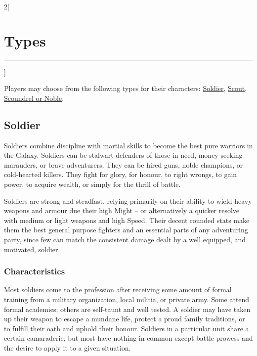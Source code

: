 \documentclass[a4paper,10pt,final]{book}
\newcommand{\HRule}{\rule{\linewidth}{0.5mm}} %
\newcommand{\newSection}[1]{\section*{#1} \addcontentsline{toc}{section}{#1} \label{sec:#1} \HRule}
\newenvironment{docsection}[1]
{
  \begin{multicols*}{2}[\newSection{#1}]
}
{
  \end{multicols*}
  \newpage
}
\begin{document}
\begin{docsection}{Types}

Players may choose from the following types for their characters: \hyperlink{sub:soldier}{Soldier}, \hyperlink{sub:scout}{Scout}, \hyperlink{sub:scoundrel_noble}{Scoundrel or Noble}.

\subsection*{Soldier} %
\label{sub:soldier}

Soldiers combine discipline with martial skills to become the best pure warriors in the Galaxy. Soldiers can be stalwart defenders of those in need, money-seeking marauders, or brave adventurers. They can be hired guns, noble champions, or cold-hearted killers. They fight for glory, for honour, to right wrongs, to gain power, to acquire wealth,  or simply for the thrill of battle. \par

Soldiers are strong and steadfast, relying primarily on their ability to wield heavy weapons and armour due their high Might -- or alternatively a quicker resolve with medium or light weapons and high Speed. Their decent rounded stats make them the best general purpose fighters and an essential parts of any adventuring party, since few can match the consistent damage dealt by a well equipped, and motivated, soldier. 

\subsubsection*{Characteristics}
\label{subsub:soldierCharacteristics}
Most soldiers come to the profession after receiving some amount of formal training from a military organization, local militia, or private army. Some attend formal academies; others are self-taunt and well tested. A soldier may have taken up their weapon to escape a mundane life, protect a proud family traditions, or to fulfill their oath and uphold their honour. Soldiers in a particular unit share a certain camaraderie, but most have nothing in common except battle prowess and the desire to apply it to a given situation. \par


\end{docsection}
\end{document}
